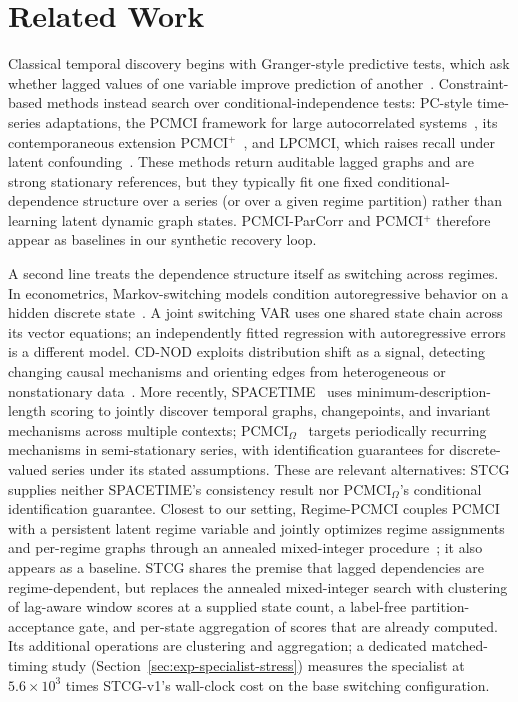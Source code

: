 \documentclass[sigconf,anonymous]{acmart}
\begin{document}
\section{Related Work}

Classical temporal discovery begins with Granger-style predictive tests, which ask whether lagged values of one variable improve prediction of another~\cite{granger1969investigating}.
Constraint-based methods instead search over conditional-independence tests: PC-style time-series adaptations, the PCMCI framework for large autocorrelated systems~\cite{runge2019detecting}, its contemporaneous extension PCMCI$^+$~\cite{runge2020pcmciplus}, and LPCMCI, which raises recall under latent confounding~\cite{gerhardus2020lpcmci}.
These methods return auditable lagged graphs and are strong stationary references, but they typically fit one fixed conditional-dependence structure over a series (or over a given regime partition) rather than learning latent dynamic graph states.
PCMCI-ParCorr and PCMCI$^+$ therefore appear as baselines in our synthetic recovery loop.

A second line treats the dependence structure itself as switching across regimes.
In econometrics, Markov-switching models condition autoregressive behavior on a hidden discrete state~\cite{hamilton1989new}. A joint switching VAR uses one shared state chain across its vector equations; an independently fitted regression with autoregressive errors is a different model.
CD-NOD exploits distribution shift as a signal, detecting changing causal mechanisms and orienting edges from heterogeneous or nonstationary data~\cite{huang2020cdnod}.
More recently, SPACETIME~\cite{mameche2025spacetime} uses minimum-description-length scoring to jointly discover temporal graphs, changepoints, and invariant mechanisms across multiple contexts; PCMCI$_\Omega$~\cite{gao2023pcmciomega} targets periodically recurring mechanisms in semi-stationary series, with identification guarantees for discrete-valued series under its stated assumptions.
These are relevant alternatives: STCG supplies neither SPACETIME's consistency result nor PCMCI$_\Omega$'s conditional identification guarantee.
Closest to our setting, Regime-PCMCI couples PCMCI with a persistent latent regime variable and jointly optimizes regime assignments and per-regime graphs through an annealed mixed-integer procedure~\cite{saggioro2020regime}; it also appears as a baseline.
STCG shares the premise that lagged dependencies are regime-dependent, but replaces the annealed mixed-integer search with clustering of lag-aware window scores at a supplied state count, a label-free partition-acceptance gate, and per-state aggregation of scores that are already computed.
Its additional operations are clustering and aggregation; a dedicated matched-timing study (Section~\ref{sec:exp-specialist-stress}) measures the specialist at $5.6\times10^{3}$ times STCG-v1's wall-clock cost on the base switching configuration.
\end{document}

